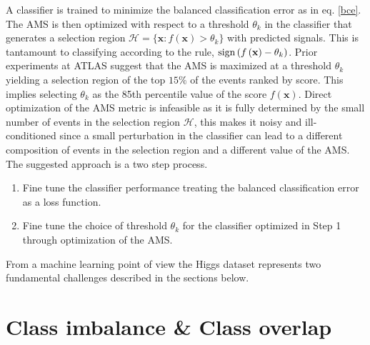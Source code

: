 A classifier is trained to minimize the balanced classification error as in eq. \ref{bce}. The AMS is then optimized with respect to a threshold $\theta_{k}$ in the classifier that generates a selection region $\mathcal{H} = \{\mathbf{x}: f(\mathbf{x}) > \theta_{k}\}$ with predicted signals. This is tantamount to classifying according to the rule,  $\operatorname{sign}\left(f\left(\mathbf{x}\right) - \theta_{k}\right)$. Prior experiments at ATLAS suggest that the AMS is maximized at a threshold $\theta_{k}$ yielding a selection region of the top $15\%$ of the events ranked by score. This implies selecting $\theta_{k}$ as the 85th percentile value of the score $f(\mathbf{x})$. Direct optimization of the AMS metric is infeasible as it is fully determined by the small number of events in the selection region $\mathcal{H}$, this makes it noisy and ill-conditioned since a small perturbation in the classifier can lead to a different composition of events in the selection region and a different value of the AMS. The suggested approach is a two step process. 

\begin{enumerate}
\item  Fine tune the classifier performance treating the balanced classification error as a loss function. 
\item Fine tune the choice of threshold $\theta_{k}$ for the classifier optimized in Step 1 through optimization of the AMS.   
\end{enumerate}

From a machine learning point of view the Higgs dataset represents two fundamental challenges described in the sections below.

\section{Class imbalance \texorpdfstring{\&}{} Class overlap}

